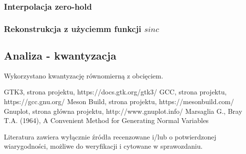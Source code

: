 \documentclass{article}
\begin{document}
\subsubsection{Interpolacja zero-hold}
\subsubsection{Rekonstrukcja z użyciemm funkcji $sinc$}

\subsection{Analiza - kwantyzacja}
Wykorzystano kwantyzację równomierną z obcięciem.

\begin{thebibliography}{0}
 GTK3, strona projektu, https://docs.gtk.org/gtk3/
 GCC, strona projektu, https://gcc.gnu.org/  
 Meson Build, strona projektu, https://mesonbuild.com/
 Gnuplot, strona główna projektu, http://www.gnuplot.info/
 Marsaglia G., Bray T.A. (1964), A Convenient Method for Generating Normal Variables
\end{thebibliography}

Literatura zawiera wyłącznie źródła recenzowane i/lub o potwierdzonej wiarygodności,
możliwe do weryfikacji i cytowane w sprawozdaniu. 
\end{document}
